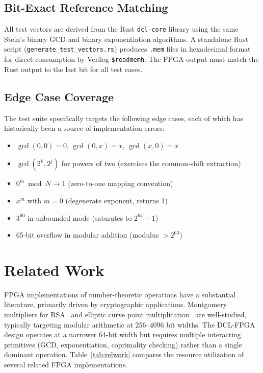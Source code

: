 \documentclass[lettersize,journal]{IEEEtran}
\begin{document}
\subsection{Bit-Exact Reference Matching}

All test vectors are derived from the Rust \texttt{dcl-core} library using the same Stein's binary GCD and binary exponentiation algorithms. A standalone Rust script (\texttt{generate\_test\_vectors.rs}) produces \texttt{.mem} files in hexadecimal format for direct consumption by Verilog \texttt{\$readmemh}. The FPGA output must match the Rust output to the last bit for all test cases.

\subsection{Edge Case Coverage}

The test suite specifically targets the following edge cases, each of which has historically been a source of implementation errors:

\begin{itemize}
\item $\gcd(0, 0) = 0$, $\gcd(0, x) = x$, $\gcd(x, 0) = x$
\item $\gcd(2^k, 2^j)$ for powers of two (exercises the common-shift extraction)
\item $0^m \bmod N \to 1$ (zero-to-one mapping convention)
\item $x^m$ with $m = 0$ (degenerate exponent, returns 1)
\item $3^{60}$ in unbounded mode (saturates to $2^{64} - 1$)
\item 65-bit overflow in modular addition (modulus $> 2^{63}$)
\end{itemize}

\section{Related Work}
\label{sec:related}

FPGA implementations of number-theoretic operations have a substantial literature, primarily driven by cryptographic applications. Montgomery multipliers for RSA~\cite{tenca2003} and elliptic curve point multiplication~\cite{guneysu2008} are well-studied, typically targeting modular arithmetic at 256--4096 bit widths. The DCL-FPGA design operates at a narrower 64-bit width but requires multiple interacting primitives (GCD, exponentiation, coprimality checking) rather than a single dominant operation. Table~\ref{tab:relwork} compares the resource utilization of several related FPGA implementations.
\end{document}
